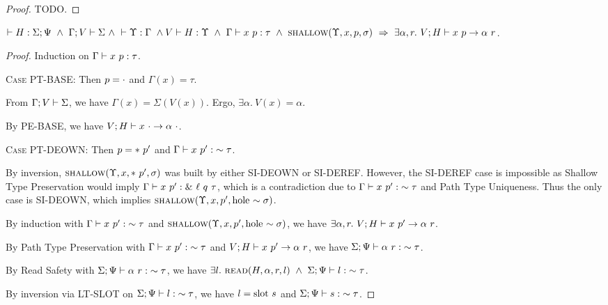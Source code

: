 \documentclass{article}
\begin{document}
\begin{proof}
  TODO.
\end{proof}

\begin{lem}
  $\HWF{H}{\Sigma}{\Psi}\ \land\ \SWF{\Gamma}{V}{\Sigma}\ \land\
   \YWF{\Upsilon}{\Gamma}\ \land\ \\ \Type{V}{H}{\Upsilon}\ \land\ 
   \PType{\Gamma}{x}{p}{\tau}\ \land\ \Shallow{\Upsilon}{x}{p}{\sigma}\ 
   \Rightarrow\ \exists \alpha, r.\ \PEval{V}{H}{x}{p}{\alpha}{r}$.
\end{lem}

\begin{proof}
  Induction on ${{\Gamma}} \vdash {{x}\ {p}} : {{\tau}}$.

  \textsc{Case PT-BASE}: 
    Then $p = \cdot$ and $\Gamma(x) = \tau$.

    From ${\Gamma}; {V} \vdash {\Sigma}$, we have $\Gamma(x) = \Sigma(V(x))$.
    Ergo, $\exists \alpha.\ V(x) = \alpha$.

    By \textsc{PE-BASE}, we have ${{V};{H}} \vdash {{x}\ {\cdot}} \rightarrow {{\alpha}\ {\cdot}}$.

  \textsc{Case PT-DEOWN}:
    Then $p = *\ {p'}$ and ${{\Gamma}} \vdash {{x}\ {p'}} : {{\sim {\tau}}}$.

    By inversion, $\textsc{shallow}({\Upsilon},{x},{*\ {p'}},{\sigma})$ was built by either
    \textsc{SI-DEOWN} or \textsc{SI-DEREF}. However, the \textsc{SI-DEREF} case is
    impossible as Shallow Type Preservation would imply
    ${{\Gamma}} \vdash {{x}\ {p'}} : {{\&\ {\ell}\ {q}\ {\tau}}}$, which is a contradiction due to
    ${{\Gamma}} \vdash {{x}\ {p'}} : {{\sim {\tau}}}$ and Path Type Uniqueness.
    Thus the only case is \textsc{SI-DEOWN}, which implies
    $\textsc{shallow}({\Upsilon},{x},{p'},{\textrm{hole}\ {\sim {\sigma}}})$.

    By induction with ${{\Gamma}} \vdash {{x}\ {p'}} : {{\sim {\tau}}}$ and
    $\textsc{shallow}({\Upsilon},{x},{p'},{\textrm{hole}\ {\sim {\sigma}}})$, we have
    $\exists \alpha, r.\ \PEval{V}{H}{x}{p'}{\alpha}{r}$.

    By Path Type Preservation with ${{\Gamma}} \vdash {{x}\ {p'}} : {{\sim {\tau}}}$ and
    ${{V};{H}} \vdash {{x}\ {p'}} \rightarrow {{\alpha}\ {r}}$, we have ${{{\Sigma}} ;{{\Psi}}} \vdash {{{\alpha}\ {r}}} : {{{\sim {\tau}}}}$.

    By Read Safety with ${{{\Sigma}} ;{{\Psi}}} \vdash {{{\alpha}\ {r}}} : {{{\sim {\tau}}}}$, we have
    $\exists l.\ \Read{H}{\alpha}{r}{l}\ \land\ \RTType{\Sigma}{\Psi}{l}{\Own{\tau}}$.

    By inversion via \textsc{LT-SLOT} on ${{\Sigma} ;{\Psi}} \vdash {{l}} : {{\sim {\tau}}}$,
    we have $l = \textrm{slot}\ {s}$ and ${{\Sigma} ;{\Psi}} \vdash {{s}} : {{\sim {\tau}}}$.


\end{proof}
\end{document}
